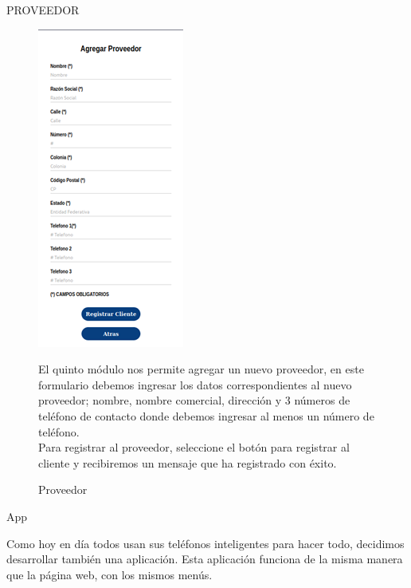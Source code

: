 \documentclass{article}
\begin{document}
\begin{center}
PROVEEDOR
\end{center}
\begin{figure}[ht]
\begin{minipage}[t]{0.5\linewidth}
\caption {Proveedor}
\centering
\includegraphics[scale=1]{fig9}
\end{minipage}
\begin{minipage}[t]{0.5\linewidth}
\bigskip
\bigskip
\bigskip
\bigskip
\bigskip
\bigskip
El quinto módulo nos permite agregar un nuevo proveedor, en este formulario debemos ingresar los datos correspondientes al nuevo proveedor; nombre, nombre comercial, dirección y 3 números de teléfono de contacto donde debemos ingresar al menos un número de teléfono. \\

Para registrar al proveedor, seleccione el botón para registrar al cliente y recibiremos un mensaje que ha registrado con éxito. 
\end{minipage}
\end{figure}

\pagebreak

\begin{center}
App
\end{center}
Como hoy en día todos usan sus teléfonos inteligentes para hacer todo, decidimos desarrollar también una aplicación. Esta aplicación funciona de la misma manera que la página web, con los mismos menús. \\
\end{document}
